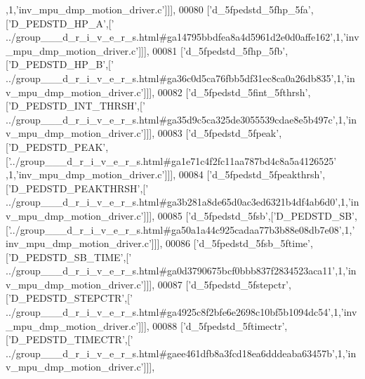 \begin{DoxyCode}
      ,1,\textcolor{stringliteral}{'inv\_mpu\_dmp\_motion\_driver.c'}]]],
00080   [\textcolor{stringliteral}{'d\_5fpedstd\_5fhp\_5fa'},[\textcolor{stringliteral}{'D\_PEDSTD\_HP\_A'},[\textcolor{stringliteral}{'
      ../group\_\_\_d\_r\_i\_v\_e\_r\_s.html#ga14795bbdfea8a4d5961d2e0d0affe162'},1,\textcolor{stringliteral}{'inv\_mpu\_dmp\_motion\_driver.c'}]]],
00081   [\textcolor{stringliteral}{'d\_5fpedstd\_5fhp\_5fb'},[\textcolor{stringliteral}{'D\_PEDSTD\_HP\_B'},[\textcolor{stringliteral}{'
      ../group\_\_\_d\_r\_i\_v\_e\_r\_s.html#ga36c0d5ca76fbb5df31ec8ca0a26db835'},1,\textcolor{stringliteral}{'inv\_mpu\_dmp\_motion\_driver.c'}]]],
00082   [\textcolor{stringliteral}{'d\_5fpedstd\_5fint\_5fthrsh'},[\textcolor{stringliteral}{'D\_PEDSTD\_INT\_THRSH'},[\textcolor{stringliteral}{'
      ../group\_\_\_d\_r\_i\_v\_e\_r\_s.html#ga35d9c5ca325de3055539cdae8e5b497c'},1,\textcolor{stringliteral}{'inv\_mpu\_dmp\_motion\_driver.c'}]]],
00083   [\textcolor{stringliteral}{'d\_5fpedstd\_5fpeak'},[\textcolor{stringliteral}{'D\_PEDSTD\_PEAK'},[\textcolor{stringliteral}{'../group\_\_\_d\_r\_i\_v\_e\_r\_s.html#ga1e71c4f2fc11aa787bd4c8a5a4126525'}
      ,1,\textcolor{stringliteral}{'inv\_mpu\_dmp\_motion\_driver.c'}]]],
00084   [\textcolor{stringliteral}{'d\_5fpedstd\_5fpeakthrsh'},[\textcolor{stringliteral}{'D\_PEDSTD\_PEAKTHRSH'},[\textcolor{stringliteral}{'
      ../group\_\_\_d\_r\_i\_v\_e\_r\_s.html#ga3b281a8de65d0ac3ed6321b4df4ab6d0'},1,\textcolor{stringliteral}{'inv\_mpu\_dmp\_motion\_driver.c'}]]],
00085   [\textcolor{stringliteral}{'d\_5fpedstd\_5fsb'},[\textcolor{stringliteral}{'D\_PEDSTD\_SB'},[\textcolor{stringliteral}{'../group\_\_\_d\_r\_i\_v\_e\_r\_s.html#ga50a1a44c925cadaa77b3b88e08db7e08'},1,\textcolor{stringliteral}{'
      inv\_mpu\_dmp\_motion\_driver.c'}]]],
00086   [\textcolor{stringliteral}{'d\_5fpedstd\_5fsb\_5ftime'},[\textcolor{stringliteral}{'D\_PEDSTD\_SB\_TIME'},[\textcolor{stringliteral}{'
      ../group\_\_\_d\_r\_i\_v\_e\_r\_s.html#ga0d3790675bcf0bbb837f2834523aca11'},1,\textcolor{stringliteral}{'inv\_mpu\_dmp\_motion\_driver.c'}]]],
00087   [\textcolor{stringliteral}{'d\_5fpedstd\_5fstepctr'},[\textcolor{stringliteral}{'D\_PEDSTD\_STEPCTR'},[\textcolor{stringliteral}{'
      ../group\_\_\_d\_r\_i\_v\_e\_r\_s.html#ga4925c8f2bfe6e2698c10bf5b1094dc54'},1,\textcolor{stringliteral}{'inv\_mpu\_dmp\_motion\_driver.c'}]]],
00088   [\textcolor{stringliteral}{'d\_5fpedstd\_5ftimectr'},[\textcolor{stringliteral}{'D\_PEDSTD\_TIMECTR'},[\textcolor{stringliteral}{'
      ../group\_\_\_d\_r\_i\_v\_e\_r\_s.html#gaee461dfb8a3fcd18ea6dddeaba63457b'},1,\textcolor{stringliteral}{'inv\_mpu\_dmp\_motion\_driver.c'}]]],

\end{DoxyCode}
